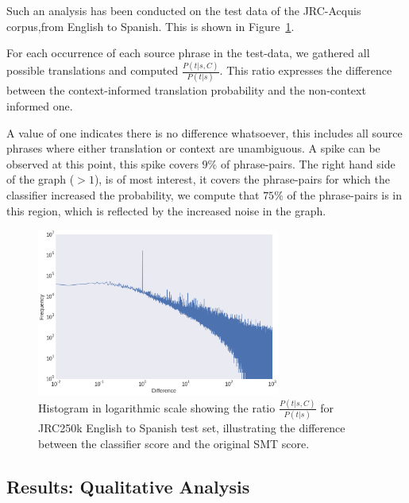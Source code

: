 \documentclass[smallextended]{svjour3}       %
\theoremstyle{break}
\begin{document}
Such an analysis has been conducted on the test data of the JRC-Acquis
corpus,from English to Spanish. This is shown in
Figure~\ref{fig:scoredifference}. 

For each occurrence of each source phrase in the test-data, we gathered all
possible translations and computed $\frac{P(t|s,C)}{P(t|s)}$. This ratio
expresses the difference between the context-informed translation probability
and the non-context informed one.

A value of one indicates there is no difference whatsoever, this includes all
source phrases where either translation or context are unambiguous. A spike can
be observed at this point, this spike covers $9\%$ of phrase-pairs. The right
hand side of the graph ($>1$), is of most interest, it covers the phrase-pairs
for which the classifier increased the probability, we compute that $75\%$ of
the phrase-pairs is in this region, which is reflected by the increased
noise in the graph. 


\begin{figure}
\includegraphics[width=80.00mm]{scoredifference.png}
\caption{Histogram in logarithmic scale showing the ratio $\frac{P(t|s,C)}{P(t|s)}$ for JRC250k English to Spanish test set, illustrating the difference between the classifier score and the original SMT score.}
\label{fig:scoredifference}
\end{figure}


\subsection{Results: Qualitative Analysis}
\end{document}

